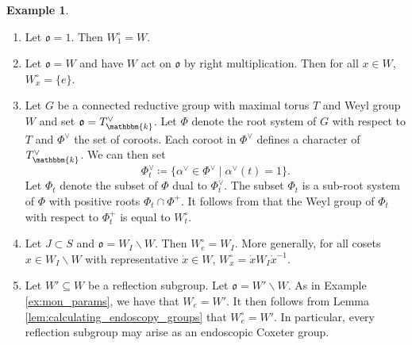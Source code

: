 \documentclass{amsart}
\renewcommand{\k}{\mathbbm{k}}
\newcommand{\fr}[1]{\mathfrak{#1}}
\theoremstyle{definition}
\newtheorem{example}[subsubsection]{Example}
\numberwithin{equation}{subsection}
\begin{document}
\begin{example}\label{ex:endoscopic_groups}
    \begin{enumerate}
        \item Let $\fr{o} = 1$. Then $W_{1}^{\circ} = W$.
        \item Let $\fr{o} = W$ and have $W$ act on $\fr{o}$ by right multiplication. Then for all $x \in W$, $W_x^{\circ} = \{e\}$. 
        \item Let $G$ be a connected reductive group with maximal torus $T$ and Weyl group $W$ and set $\fr{o} = T_{\k}^{\vee}$. 
        Let $\Phi$ denote the root system of $G$ with respect to $T$ and $\Phi^{\vee}$ the set of coroots.
        Each coroot in $\Phi^{\vee}$ defines a character of $T_{\k}^{\vee}$. We can then set 
        \[\Phi_t^{\vee} \coloneq \{ \alpha^{\vee} \in \Phi^{\vee} \mid \alpha^{\vee} (t) = 1 \}.\]
        Let $\Phi_t$ denote the subset of $\Phi$ dual to $\Phi_t^{\vee}$. The subset $\Phi_t$ is a sub-root system of $\Phi$ with positive roots $\Phi_t \cap \Phi^+$.
        It follows from \cite[\S 4]{LY} that the Weyl group of $\Phi_t$ with respect to $\Phi_t^+$ is equal to $W_t^{\circ}$.
        \item Let $J \subset S$ and $\fr{o} = W_I \backslash W$. Then $W_{e}^{\circ} = W_I$. More generally, for all cosets $x \in W_I \backslash W$ with representative $\dot{x} \in W$, $W_x^{\circ} = \dot{x}W_I \dot{x}^{-1}$.
        \item  Let $W' \subseteq W$ be a reflection subgroup. Let $\fr{o} = W' \backslash W$. As in Example \ref{ex:mon_params}, we have that $W_e = W'$.
        It then follows from Lemma \ref{lem:calculating_endoscopy_groups} that $W_e^{\circ} = W'$. In particular, every reflection subgroup may arise as an endoscopic Coxeter group.
    \end{enumerate}
\end{example}
\end{document}
